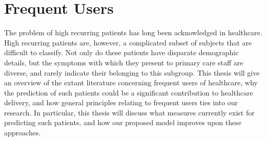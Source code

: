 \section{Frequent Users}
\label{section:frequent-users-rr}

The problem of high recurring patients has long been acknowledged in healthcare. High recurring patients are, however, a complicated subset of subjects that are difficult to classify. Not only do these patients have disparate demographic details, but the symptoms with which they present to primary care staff are diverse, and rarely indicate their belonging to this subgroup. This thesis will give an overview of the extant literature concerning frequent users of healthcare, why the prediction of such patients could be a significant contribution to healthcare delivery, and how general principles relating to frequent users ties into our research. In particular, this thesis will discuss what measures currently exist for predicting such patients, and how our proposed model improves upon these approaches.

